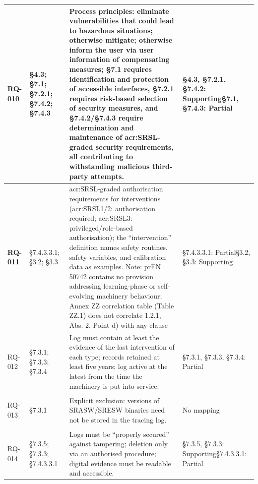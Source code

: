 \begin{longtable}{|>{\bfseries}p{1cm}|p{2.5cm}|p{9cm}|>{\centering\arraybackslash}p{2cm}|}
	RQ-010 &
	\S4.3;  \newline \S7.1;  \newline \S7.2.1;  \newline \S7.4.2;  \newline\S7.4.3 &
	Process principles: eliminate vulnerabilities that could lead to hazardous situations; otherwise mitigate; otherwise inform the user via user information of compensating measures; \S7.1 requires identification and protection of accessible interfaces, \S7.2.1 requires risk-based selection of security measures, and \S7.4.2/\S7.4.3 require determination and maintenance of \gls{acr:SRSL}-graded security requirements, all contributing to withstanding malicious third-party attempts. &
	\S4.3, \S7.2.1, \S7.4.2: Supporting\newline\S7.1, \S7.4.3: Partial \\
	\hline
	
	RQ-011 &
	\S7.4.3.3.1;  \newline \S3.2;  \newline \S3.3 &
	\gls{acr:SRSL}-graded authorisation requirements for interventions (\gls{acr:SRSL}1/2: authorisation required; \gls{acr:SRSL}3: privileged/role-based authorisation); the ``intervention'' definition names safety routines, safety variables, and calibration data as examples. Note: prEN 50742 contains no provision addressing learning-phase or self-evolving machinery behaviour; Annex ZZ correlation table (Table ZZ.1) does not correlate 1.2.1, Abs. 2, Point d) with any clause &
	\S7.4.3.3.1: Partial\newline\S3.2, \S3.3: Supporting \\
	\hline
	
	RQ-012 &
	\S7.3.1;  \newline \S7.3.3;  \newline \S7.3.4 &
	Log must contain at least the evidence of the last intervention of each type; records retained at least five years; log active at the latest from the time the machinery is put into service. &
	\S7.3.1, \S7.3.3, \S7.3.4: Partial \\
	\hline
	
	RQ-013 &
	\S7.3.1 &
	Explicit exclusion: versions of SRASW/SRESW binaries need not be stored in the tracing log. &
	No mapping \\
	\hline
	
	RQ-014 &
	\S7.3.5;  \newline \S7.3.3;  \newline \S7.4.3.3.1 &
	Logs must be ``properly secured'' against tampering; deletion only via an authorised procedure; digital evidence must be readable and accessible. &
	\S7.3.5, \S7.3.3: Supporting\newline\S7.4.3.3.1: Partial \\
	\hline
	
	
\end{longtable}

